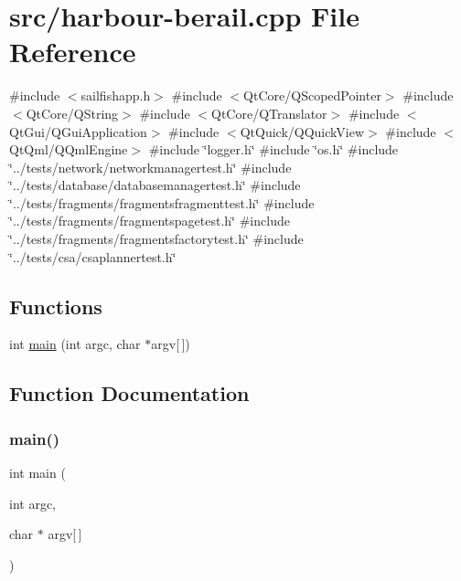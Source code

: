 \hypertarget{harbour-berail_8cpp}{}\section{src/harbour-\/berail.cpp File Reference}
\label{harbour-berail_8cpp}
{\ttfamily \#include $<$sailfishapp.\+h$>$}\newline
{\ttfamily \#include $<$Qt\+Core/\+Q\+Scoped\+Pointer$>$}\newline
{\ttfamily \#include $<$Qt\+Core/\+Q\+String$>$}\newline
{\ttfamily \#include $<$Qt\+Core/\+Q\+Translator$>$}\newline
{\ttfamily \#include $<$Qt\+Gui/\+Q\+Gui\+Application$>$}\newline
{\ttfamily \#include $<$Qt\+Quick/\+Q\+Quick\+View$>$}\newline
{\ttfamily \#include $<$Qt\+Qml/\+Q\+Qml\+Engine$>$}\newline
{\ttfamily \#include \char`\"{}logger.\+h\char`\"{}}\newline
{\ttfamily \#include \char`\"{}os.\+h\char`\"{}}\newline
{\ttfamily \#include \char`\"{}../tests/network/networkmanagertest.\+h\char`\"{}}\newline
{\ttfamily \#include \char`\"{}../tests/database/databasemanagertest.\+h\char`\"{}}\newline
{\ttfamily \#include \char`\"{}../tests/fragments/fragmentsfragmenttest.\+h\char`\"{}}\newline
{\ttfamily \#include \char`\"{}../tests/fragments/fragmentspagetest.\+h\char`\"{}}\newline
{\ttfamily \#include \char`\"{}../tests/fragments/fragmentsfactorytest.\+h\char`\"{}}\newline
{\ttfamily \#include \char`\"{}../tests/csa/csaplannertest.\+h\char`\"{}}\newline
\subsection*{Functions}
\begin{DoxyCompactItemize}
\item 
int \mbox{\hyperlink{harbour-berail_8cpp_a0ddf1224851353fc92bfbff6f499fa97}{main}} (int argc, char $\ast$argv\mbox{[}$\,$\mbox{]})
\end{DoxyCompactItemize}


\subsection{Function Documentation}
\mbox{\label{harbour-berail_8cpp_a0ddf1224851353fc92bfbff6f499fa97}} 
\subsubsection{\texorpdfstring{main()}{main()}}
{\footnotesize\ttfamily int main (\begin{DoxyParamCaption}\item[{int}]{argc,  }\item[{char $\ast$}]{argv\mbox{[}$\,$\mbox{]} }\end{DoxyParamCaption})}

